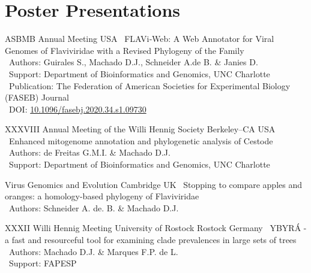 
\section{Poster Presentations}

	{ASBMB Annual Meeting}
	{}
	{USA}
	{}
	{
		\textbullet~FLAVi‐Web: A Web Annotator for Viral Genomes of Flaviviridae with a Revised Phylogeny of the Family\\
		\textbullet~Authors: Guirales S.,  Machado D.J.,  Schneider A.de B. \&  Janies D.\\
		\textbullet~Support: Department of Bioinformatics and Genomics,  UNC Charlotte\\
		\textbullet~Publication: The Federation of American Societies for Experimental Biology (FASEB) Journal\\
		\textbullet~DOI: \href{https://doi.org/10.1096/fasebj.2020.34.s1.09730}{10.1096/fasebj.2020.34.s1.09730}
	}

\vspace{.5em}

	{XXXVIII Annual Meeting of the Willi Hennig Society}
	{Berkeley--CA}
	{USA}
	{}
	{
		\textbullet~Enhanced mitogenome annotation and phylogenetic analysis of Cestode\\
		\textbullet~Authors: de Freitas G.M.I. \& Machado D.J.\\
		\textbullet~Support: Department of Bioinformatics and Genomics,  UNC Charlotte
	}

\vspace{.5em}

	{Virus Genomics and Evolution}
	{Cambridge}
	{UK}
	{}
	{
		\textbullet~Stopping to compare apples and oranges: a homology-based phylogeny of Flaviviridae \\
		\textbullet~Authors: Schneider A. de. B. \& Machado D.J.
}

\vspace{.5em}

	{XXXII Willi Hennig Meeting}
	{University of Rostock}
	{Rostock}
	{Germany}
	{
		\textbullet~YBYRÁ - a fast and resourceful tool for examining clade prevalences in large sets of trees\\
		\textbullet~Authors: Machado D.J. \& Marques F.P. de L.\\
		\textbullet~Support: FAPESP
}